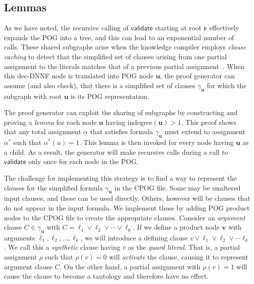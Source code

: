 \documentclass[twoside,11pt]{article}
\newcommand{\obar}[1]{\overline{#1}}
\newcommand{\lit}{\ell}
\newcommand{\extend}[1]{#1^{*}}
\newcommand{\assign}{\alpha}
\newcommand{\eassign}{\extend{\alpha}}
\newcommand{\passign}{\rho}
\newcommand{\indegree}{\textrm{indegree}}
\newcommand{\validate}{\textsf{validate}}
\newcommand{\makenode}[1]{\mathbf{#1}}
\newcommand{\nodeu}{\makenode{u}}
\newcommand{\nodev}{\makenode{v}}
\newcommand{\noder}{\makenode{r}}
\begin{document}
\subsection{Lemmas}
\label{sect:lemma}

As we have noted, the recursive calling of $\validate$ starting at
root $\noder$ effectively expands the POG into a tree, and this can
lead to an exponential number of calls.
These shared subgraphs arise when the knowledge compiler employs \emph{clause caching}
to detect that the simplified set of
clauses arising from one partial assignment to the literals matches that
of a previous partial assignment~\cite{darwiche:aaai:2002}.
When this dec-DNNF node is translated into POG
node $\nodeu$, the proof generator can assume (and also check), that
there is a simplified set of clauses $\gamma_{\nodeu}$
for which the subgraph with root $\nodeu$ is its POG representation.

The proof generator can exploit the sharing of subgraphs
by constructing and proving a \emph{lemma} for each node
$\nodeu$ having $\indegree(\nodeu) > 1$.  This proof shows that any
total assignment $\assign$ that satisfies formula $\gamma_{\nodeu}$ must extend to assignment $\eassign$ such that
$\eassign(u) = 1$.  This lemma is then invoked for every node having
$\nodeu$ as a child.
As a result, the generator will make recursive calls during a call to $\validate$ only once for each node in the POG\@.

The challenge for implementing this strategy is to find a way to
represent the clauses for the simplified formula $\gamma_{\nodeu}$ in the CPOG file.  Some may be
unaltered input clauses, and these can be used directly.  Others,
however will be clauses that do not appear in the input formula.  We
implement these by adding POG product nodes to the CPOG file to create
the appropriate clauses.  Consider an \emph{argument} clause
$C \in \gamma_{\nodeu}$ with $C = \lit_1 \lor \lit_2 \lor \cdots \lor \lit_k$.  If we
define a product node $\nodev$ with arguments
$\obar{\lit}_1, \obar{\lit}_2, \ldots, \obar{\lit}_k$, 
we will introduce a defining clause
$v \lor \lit_1 \lor \lit_2 \lor \cdots \lit_k$.  We call this a {\em
  synthetic} clause having $\obar{v}$ as the \emph{guard literal}.
That is, a partial assignment $\passign$ such that $\passign(v) = 0$ will {\em
  activate} the clause, causing it to represent argument clause $C$.  On the other
hand, a partial assignment with $\passign(v) = 1$ will
cause the clause to become a tautology and therefore have no effect.
\end{document}
